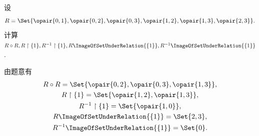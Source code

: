 \begin{example}
设\begin{equation*}
	R = \Set{
		\opair{0,1},
		\opair{0,2},
		\opair{0,3},
		\opair{1,2},
		\opair{1,3},
		\opair{2,3}
	}.
\end{equation*}
计算\(R \circ R,
R \SetRestrict \{1\},
R^{-1} \SetRestrict \{1\},
R\ImageOfSetUnderRelation{\{1\}},
R^{-1}\ImageOfSetUnderRelation{\{1\}}\).
\begin{solution}
由题意有\begin{gather*}
	R \circ R
	= \Set{
		\opair{0,2},
		\opair{0,3},
		\opair{1,3}
	}, \\
	R \SetRestrict \{1\}
	= \Set{
		\opair{1,2},
		\opair{1,3}
	}, \\
	R^{-1} \SetRestrict \{1\}
	= \Set{
		\opair{1,0}
	}, \\
	R\ImageOfSetUnderRelation{\{1\}}
	= \Set{
		2,
		3
	}, \\
	R^{-1}\ImageOfSetUnderRelation{\{1\}}
	= \Set{
		0
	}.
\end{gather*}
\end{solution}
\end{example}

